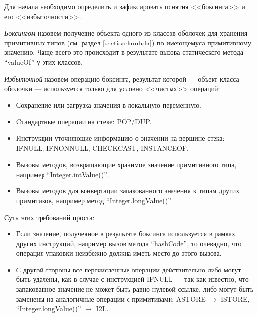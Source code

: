 Для начала необходимо определить и зафиксировать понятия <<боксинга>> и его <<избыточности>>.

\textit{Боксингом} назовем получение объекта одного из классов-оболочек для хранения примитивных
типов (см. раздел \ref{section:lambda}) по имеющемуса примитивному значению.
Чаще всего это происходит в результате вызова статического метода ``valueOf'' у этих классов.

\textit{Избыточной} назовем операцию боксинга, результат которой --- объект класса-оболочки ---
используется только для условно <<чистых>> операций:
\begin{itemize}
    \item Сохранение или загрузка значения в локальную переменную.
    \item Cтандартные операции на стеке: POP/DUP.
    \item Инструкции уточняющие информацию о значении на вершине стека: IFNULL, IFNONNULL,
    CHECKCAST, INSTANCEOF.
    \item Вызовы методов, возвращающие хранимое значение примитивного типа, например
    ``Integer.intValue()''.
    \item Вызовы методов для конвертации запакованного значения к типам других примитивов,
    например метод ``Integer.longValue()''.
\end{itemize}

Суть этих требований проста:
\begin{itemize}
    \item Если значение, полученное в результате боксинга используется в рамках других инструкций,
    например вызов метода ``hashCode'', то очевидно, что операция упаковки неизбежно должна иметь
    место до этого вызова.

    \item С другой стороны все перечисленные операции действительно либо могут быть удалены, как
    в случае с инструкцией IFNULL --- так как известно, что запакованное значение не может быть
    равно нулевой ссылке, либо могут быть заменены на аналогичные операции с примитивами:
    ASTORE $\to$ ISTORE, ``Integer.longValue()'' $\to$ I2L.
\end{itemize}

